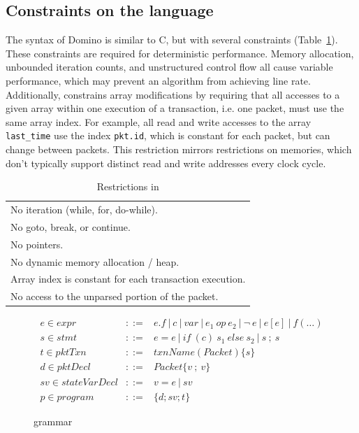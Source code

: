 \subsection{Constraints on the language}
\label{ss:constraints}

The syntax of Domino is similar to C, but with several constraints
(Table~\ref{tab:restrict}).  These constraints are required for deterministic
performance.  Memory allocation, unbounded iteration counts, and unstructured
control flow all cause variable performance, which may prevent an algorithm
from achieving line rate.  Additionally, \pktlanguage constrains array
modifications by requiring that all accesses to a given array within one
execution of a transaction, i.e. one packet, must use the same array index. For
example, all read and write accesses to the array \texttt{last\_time} use the
index \texttt{pkt.id}, which is constant for each packet, but can change
between packets. This restriction mirrors restrictions on memories, which don't
typically support distinct read and write addresses every clock cycle.

\begin{table}
  \begin{tabular}{p{}}
    No iteration (while, for, do-while).\\
    No goto, break, or continue.\\
    No pointers.\\
    No dynamic memory allocation / heap.\\
    Array index is constant for each transaction execution.\\
    No access to the unparsed portion of the packet.\\
  \end{tabular}
  \caption{Restrictions in \pktlanguage}
  \label{tab:restrict}
\end{table}

\begin{figure}
\newcommand{\sep}{~|~}
\begin{scriptsize}
\begin{eqnarray*}
e \in expr &::=& e.f \sep c \sep var \sep e_1~op~e_2 \sep \neg~e \sep e[e] \sep f(\ldots) \\
%
s \in stmt &::=& e = e \sep if~(c)~s_1~else~s_2 \sep s~;~s \\
%
t \in pktTxn &::=& txnName(Packet) \{ s \} \\
%
d \in pktDecl &::=& Packet \{ v~;~v \} \\
%
sv \in stateVarDecl &::=& v = e \sep sv \\
%
p \in program &::=& \{ d ; sv ; t \}
\end{eqnarray*}
\end{scriptsize}
\label{fig:grammar}
\caption{\pktlanguage grammar}
\end{figure}

